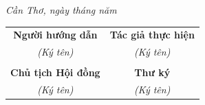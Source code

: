 \documentclass[a4paper,oneside]{article} %
\begin{document}
	\begin{flushright}\it 
		Cần Thơ, ngày \quad tháng \quad năm \qquad\,\\
	\end{flushright}
	\begin{center}
		\begin{tabular*}{.8\columnwidth}{@{\extracolsep\fill}cc@{\extracolsep\fill}} 
			\textbf{Người hướng dẫn} & \textbf{Tác giả thực hiện}\\
			\textit{(Ký tên)} & \textit{(Ký tên)}\\
				\vspace{60pt}&\\
					\textbf{Chủ tịch Hội đồng} & \textbf{Thư ký}\\
				\textit{(Ký tên)} & \textit{(Ký tên)}\\
		\end{tabular*}
	\end{center}
	
\end{document}
